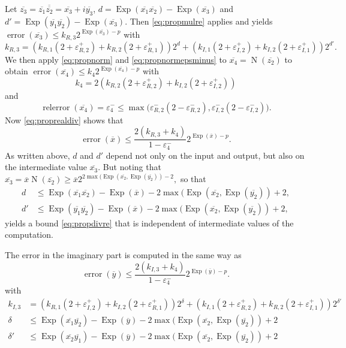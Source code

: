 \documentclass {article}
\newcommand {\appro}[1]{\overline {#1}}
\DeclareMathOperator{\Exp}{\operatorname {Exp}}
\newcommand{\error}{\operatorname {error}}
\newcommand{\relerror}{\operatorname {relerror}}
\newcommand{\Norm}{\operatorname {N}}
\renewcommand {\epsilon}{\varepsilon}
\renewcommand {\leq}{\leqslant}
\renewcommand {\geq}{\geqslant}
\begin{document}
Let $\appro {z_3} = \appro {z_1} \overline {\appro {z_2}}
= \appro {x_3} + i \appro {y_3}$,
$d = \Exp (\appro {x_1} \appro {x_2}) - \Exp (\appro {x_3})$
and $d' = \Exp (\appro {y_1} \appro {y_2}) - \Exp (\appro {x_3})$.
Then \eqref {eq:propmulre} applies and yields
$\error (\appro {x_3}) \leq k_{R, 3} 2^{\Exp (\appro {x_3}) - p}$
with
\[
k_{R, 3} = \left( k_{R, 1} (2 + \epsilon_{R, 2}^+)
   + k_{R, 2} (2 + \epsilon_{R, 1}^+) \right) 2^d
   + \left( k_{I, 1} (2 + \epsilon_{I, 2}^+)
   + k_{I, 2} (2 + \epsilon_{I, 1}^+) \right) 2^{d'}.
\]
We then apply \eqref {eq:propnorm} and \eqref {eq:propnormepsminus}
to $\appro {x_4} = \Norm (\appro {z_2})$ to  obtain
$\error (\appro {x_4}) \leq k_4 2^{\Exp (\appro {x_4}) - p}$ with
\[
k_4 =   2 \left(
       k_{R, 2} (2 + \epsilon_{R, 2}^+)
     + k_{I, 2} (2 + \epsilon_{I, 2}^+)
\right)
\]
and
\[
\relerror (\appro {x_4}) = \epsilon_4^-
\leq
\max \big(
   \epsilon_{R, 2}^- (2 - \epsilon_{R, 2}^-),
   \epsilon_{I, 2}^- (2 - \epsilon_{I, 2}^-)
\big).
\]
Now \eqref {eq:proprealdiv} shows that
\begin {equation}
\label {eq:propdivre}
\error (\appro x)
\leq
\frac {2 (k_{R, 3} + k_4)}{1 - \epsilon_4^-} 2^{\Exp (\appro x) - p}.
\end {equation}
As written above, $d$ and $d'$ depend not only on the input and output, but
also on the intermediate value $\appro {x_3}$. But noting that
$
\appro {x_3} = \appro x \Norm (\appro {z_2})
\geq
\appro x 2^{2 \max (\Exp (\appro {x_2}, \Exp (\appro {y_2})) - 2},
$
so that
\begin {align*}
d &\leq
\Exp (\appro {x_1} \appro {x_2}) - \Exp (\appro x)
- 2 \max (\Exp (\appro {x_2}, \Exp (\appro {y_2})) + 2, \\
d' &\leq
\Exp (\appro {y_1} \appro {y_2}) - \Exp (\appro x)
- 2 \max (\Exp (\appro {x_2}, \Exp (\appro {y_2})) + 2,
\end {align*}
yields a bound \eqref {eq:propdivre} that is independent of
intermediate values of the computation.

The error in the imaginary part is computed in the same way as
\begin {equation}
\label {eq:propdivim}
\error (\appro y)
\leq
\frac {2 (k_{I, 3} + k_4)}{1 - \epsilon_4^-} 2^{\Exp (\appro y) - p}.
\end {equation}
with
\begin {align*}
k_{I, 3}
&= \left( k_{R, 1} (2 + \epsilon_{I, 2}^+)
   + k_{I, 2} (2 + \epsilon_{R, 1}^+) \right) 2^\delta
   + \left( k_{I, 1} (2 + \epsilon_{R, 2}^+)
   + k_{R, 2} (2 + \epsilon_{I, 1}^+) \right) 2^{\delta'} \\
\delta &\leq
\Exp (\appro {x_1} \appro {y_2}) - \Exp (\appro y)
- 2 \max (\Exp (\appro {x_2}, \Exp (\appro {y_2})) + 2 \\
\delta' &\leq
\Exp (\appro {x_2} \appro {y_1}) - \Exp (\appro y)
- 2 \max (\Exp (\appro {x_2}, \Exp (\appro {y_2})) + 2
\end {align*}
\end{document}
